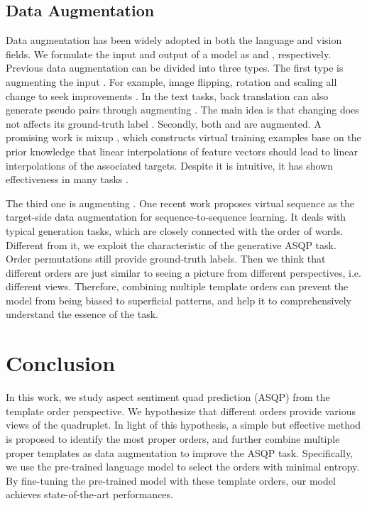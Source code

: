 \documentclass[11pt]{article}
\begin{document}
\subsection{Data Augmentation}
Data augmentation has been widely adopted in both the language and vision fields. We formulate the input and output of a model as  and , respectively. Previous data augmentation can be divided into three types. The first type is augmenting the input . For example, image flipping, rotation and scaling all change  to seek improvements \cite{shorten2019survey}. In the text tasks, back translation \cite{sugiyama2019data} can also generate pseudo pairs through augmenting . The main idea is that changing  does not affects its ground-truth label . Secondly, both  and  are augmented. A promising work is mixup \cite{zhang2018mixup}, which constructs virtual training examples base on the prior knowledge that linear interpolations of feature vectors should lead to linear interpolations of the associated targets. Despite it is intuitive, it has shown effectiveness in many tasks \cite{sun-etal-2020-mixup}. 

The third one is augmenting . One recent work proposes virtual sequence as the target-side data augmentation \cite{xie2022target} for sequence-to-sequence learning. It deals with typical generation tasks, which are closely connected with the order of words. Different from it, we exploit the characteristic of the generative ASQP task. Order permutations still provide ground-truth labels. Then we think that different orders are just similar to seeing a picture from different perspectives, i.e. different views. Therefore, combining multiple template orders can prevent the model from being biased to superficial patterns, and help it to comprehensively understand the essence of the task. 




\section{Conclusion}
In this work, we study aspect sentiment quad prediction (ASQP) from the template order perspective. We hypothesize that different orders provide various views of the quadruplet. In light of this hypothesis, a simple but effective method is proposed to identify the most proper orders, and further combine multiple proper templates as data augmentation to improve the ASQP task. Specifically, we use the pre-trained language model to select the orders with minimal entropy. By fine-tuning the pre-trained model with these template orders, our model achieves state-of-the-art performances. 
\end{document}
